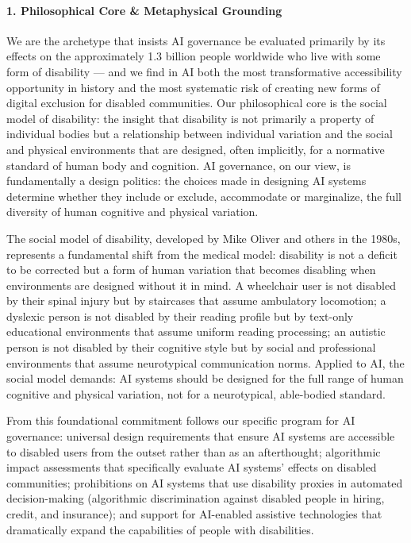 \paragraph{1. Philosophical Core \& Metaphysical
Grounding}\label{philosophical-core-metaphysical-grounding-40}

We are the archetype that insists AI governance be evaluated primarily
by its effects on the approximately 1.3 billion people worldwide who
live with some form of disability --- and we find in AI both the most
transformative accessibility opportunity in history and the most
systematic risk of creating new forms of digital exclusion for disabled
communities. Our philosophical core is the social model of disability:
the insight that disability is not primarily a property of individual
bodies but a relationship between individual variation and the social
and physical environments that are designed, often implicitly, for a
normative standard of human body and cognition. AI governance, on our
view, is fundamentally a design politics: the choices made in designing
AI systems determine whether they include or exclude, accommodate or
marginalize, the full diversity of human cognitive and physical
variation.

The social model of disability, developed by Mike Oliver and others in
the 1980s, represents a fundamental shift from the medical model:
disability is not a deficit to be corrected but a form of human
variation that becomes disabling when environments are designed without
it in mind. A wheelchair user is not disabled by their spinal injury but
by staircases that assume ambulatory locomotion; a dyslexic person is
not disabled by their reading profile but by text-only educational
environments that assume uniform reading processing; an autistic person
is not disabled by their cognitive style but by social and professional
environments that assume neurotypical communication norms. Applied to
AI, the social model demands: AI systems should be designed for the full
range of human cognitive and physical variation, not for a neurotypical,
able-bodied standard.

From this foundational commitment follows our specific program for AI
governance: universal design requirements that ensure AI systems are
accessible to disabled users from the outset rather than as an
afterthought; algorithmic impact assessments that specifically evaluate
AI systems' effects on disabled communities; prohibitions on AI systems
that use disability proxies in automated decision-making (algorithmic
discrimination against disabled people in hiring, credit, and
insurance); and support for AI-enabled assistive technologies that
dramatically expand the capabilities of people with disabilities.

